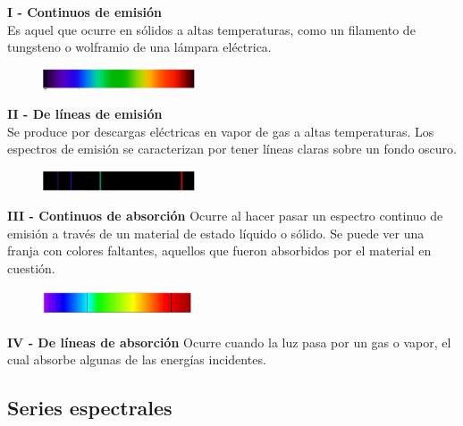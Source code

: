 \documentclass[a4paper]{article}
\begin{document}
        \textbf{I - Continuos de emisión} \\
            \indent Es aquel que ocurre en sólidos a altas temperaturas, como un filamento de tungsteno o wolframio de una lámpara eléctrica.

            \begin{figure}[h!]
                \centering
                \includegraphics[width=4.5cm]{../imagenes/espectroContinuoDeEmision.png}
            \end{figure}

        \textbf{II - De líneas de emisión} \\
            \indent Se produce por descargas eléctricas en vapor de gas a altas temperaturas.
            \indent Los espectros de emisión se caracterizan por tener líneas claras sobre un fondo oscuro.

            \begin{figure}[h!]
                \centering
                \includegraphics[width=4.5cm]{../imagenes/espectroLineasDeEmision.png}
            \end{figure}

        \textbf{III - Continuos de absorción}
            \indent Ocurre al hacer pasar un espectro continuo de emisión a través de un material de estado líquido o sólido. Se puede ver una franja con colores faltantes, aquellos que fueron absorbidos por el material en cuestión.

            \begin{figure}[h!]
                \centering
                \includegraphics[width=4.5cm]{../imagenes/espectroContinuoDeAbsorcion.png}
            \end{figure}

        \textbf{IV - De líneas de absorción}
            \indent Ocurre cuando la luz pasa por un gas o vapor, el cual absorbe algunas de las energías incidentes.

    \subsection{Series espectrales}
\end{document}
